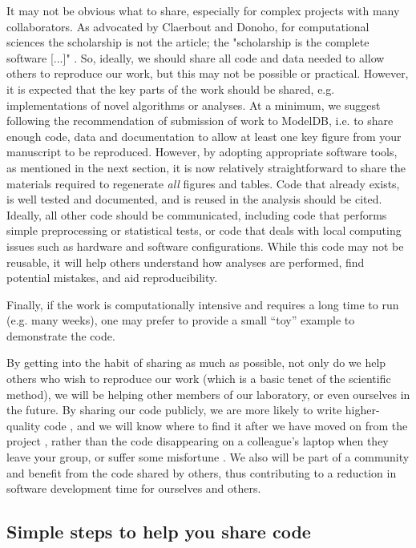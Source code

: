 \documentclass[11pt]{article}
\begin{document}
It may not be obvious what to share, especially for complex projects
with many collaborators.  As advocated by Claerbout and Donoho, for
computational sciences the scholarship is not the article; the
"scholarship is the complete software [...]"
\cite{claerbout_electronic_1992,donoho_invitation_2010}.  So, ideally,
we should share all code and data needed to allow others to
reproduce our work, but this may not be possible or practical.
However, it is expected that the key parts of the work should be shared,
e.g. implementations of novel algorithms or analyses.  At a minimum,
we suggest following the recommendation of submission of work to
ModelDB\cite{modeldb}, i.e. to share enough code, data and
documentation to allow at least one key figure from your manuscript to
be reproduced.  However, by adopting appropriate software tools, as
mentioned in the next section, it is now relatively straightforward to
share the materials required to regenerate \textit{all} figures and
tables.  Code that already exists, is well tested and documented, and is reused 
in the analysis should be cited. Ideally, all other code should be 
communicated, including code that performs simple
preprocessing or statistical tests, or code that deals with local
computing issues such as hardware and software configurations. 
While this code may not be reusable, it will help others understand how
analyses are performed, find potential mistakes, and aid reproducibility. 

Finally, if the work is computationally intensive and requires a long
time to run (e.g. many weeks), one may prefer to provide a small ``toy''
example to demonstrate the code.

By getting into the habit of sharing as much as possible, not only do
we help others who wish to reproduce our work (which is a basic
tenet of the scientific method), we will be helping other members of
our laboratory, or even ourselves in the future.  By sharing our code
publicly, we are more likely to write higher-quality code
\cite{Easterbrook2014}, and we will know where to find it after
we have moved on from the project \cite{Halchenko2015}, rather than the
code disappearing on a colleague's laptop when they leave your group, or 
suffer some misfortune \cite{Berg2016}.
We also will be part of a community and benefit from the code shared by
others, thus contributing to a reduction in software development time
for ourselves and others.

\subsection*{Simple steps to help you share code}
\end{document}
